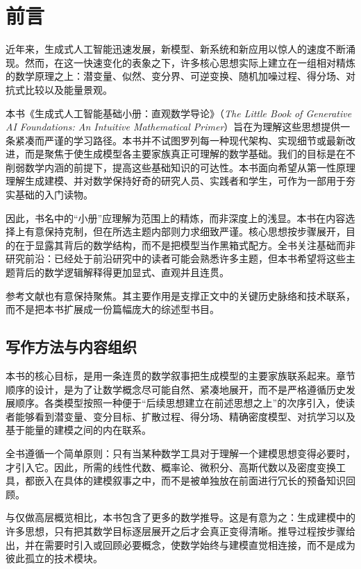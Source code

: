 \chapter*{前言}

近年来，生成式人工智能迅速发展，新模型、新系统和新应用以惊人的速度不断涌现。然而，在这一快速变化的表象之下，许多核心思想实际上建立在一组相对精炼的数学原理之上：潜变量、似然、变分界、可逆变换、随机加噪过程、得分场、对抗式比较以及能量景观。

本书《生成式人工智能基础小册：直观数学导论》（\emph{The Little Book of Generative AI Foundations: An Intuitive Mathematical Primer}）旨在为理解这些思想提供一条紧凑而严谨的学习路径。本书并不试图罗列每一种现代架构、实现细节或最新改进，而是聚焦于使生成模型各主要家族真正可理解的数学基础。我们的目标是在不削弱数学内涵的前提下，提高这些基础知识的可达性。本书面向希望从第一性原理理解生成建模、并对数学保持好奇的研究人员、实践者和学生，可作为一部用于夯实基础的入门读物。

因此，书名中的“小册”应理解为范围上的精炼，而非深度上的浅显。本书在内容选择上有意保持克制，但在所选主题内部则力求细致严谨。核心思想按步骤展开，目的在于显露其背后的数学结构，而不是把模型当作黑箱式配方。全书关注基础而非研究前沿：已经处于前沿研究中的读者可能会熟悉许多主题，但本书希望将这些主题背后的数学逻辑解释得更加显式、直观并且连贯。

参考文献也有意保持聚焦。其主要作用是支撑正文中的关键历史脉络和技术联系，而不是把本书扩展成一份篇幅庞大的综述型书目。

\section*{写作方法与内容组织}
%

本书的核心目标，是用一条连贯的数学叙事把生成模型的主要家族联系起来。章节顺序的设计，是为了让数学概念尽可能自然、紧凑地展开，而不是严格遵循历史发展顺序。各类模型按照一种便于“后续思想建立在前述思想之上”的次序引入，使读者能够看到潜变量、变分目标、扩散过程、得分场、精确密度模型、对抗学习以及基于能量的建模之间的内在联系。

全书遵循一个简单原则：只有当某种数学工具对于理解一个建模思想变得必要时，才引入它。因此，所需的线性代数、概率论、微积分、高斯代数以及密度变换工具，都嵌入在具体的建模叙事之中，而不是被单独放在前面进行冗长的预备知识回顾。

与仅做高层概览相比，本书包含了更多的数学推导。这是有意为之：生成建模中的许多思想，只有把其数学目标逐层展开之后才会真正变得清晰。推导过程按步骤给出，并在需要时引入或回顾必要概念，使数学始终与建模直觉相连接，而不是成为彼此孤立的技术模块。

